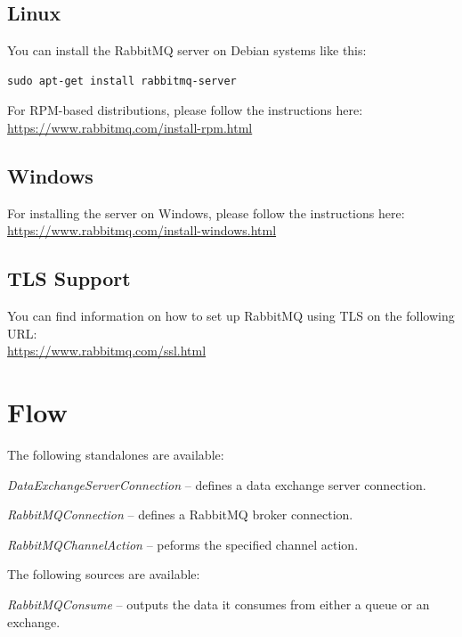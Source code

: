 \documentclass[a4paper]{book}
\begin{document}
\section{Linux}
You can install the RabbitMQ server on Debian systems like this:
\begin{verbatim}
sudo apt-get install rabbitmq-server
\end{verbatim}

\noindent For RPM-based distributions, please follow the instructions here: \\
\url{https://www.rabbitmq.com/install-rpm.html}{}

\section{Windows}
For installing the server on Windows, please follow the instructions here: \\
\url{https://www.rabbitmq.com/install-windows.html}{}

\section{TLS Support}
\label{tls_support}
You can find information on how to set up RabbitMQ using TLS on the
following URL: \\
\url{https://www.rabbitmq.com/ssl.html}{}


\chapter{Flow}
The following standalones are available:
\begin{tight_itemize}
  \item \textit{DataExchangeServerConnection} -- defines a data exchange server connection.
  \item \textit{RabbitMQConnection} -- defines a RabbitMQ broker connection.
  \item \textit{RabbitMQChannelAction} -- peforms the specified channel action.
\end{tight_itemize}

\noindent The following sources are available:
\begin{tight_itemize}
  \item \textit{RabbitMQConsume} -- outputs the data it consumes from either
  a queue or an exchange.
\end{tight_itemize}
\end{document}
